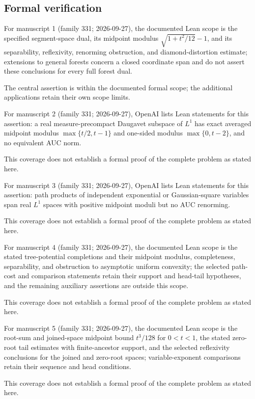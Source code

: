 \documentclass[11pt]{article}
\begin{document}
\subsection{Formal verification}
For manuscript 1 (family 331; 2026-09-27), the documented Lean scope is the specified segment-space dual, its midpoint modulus $\sqrt{1+t^2/12}-1$, and its separability, reflexivity, renorming obstruction, and diamond-distortion estimate; extensions to general forests concern a closed coordinate span and do not assert these conclusions for every full forest dual.

The central assertion is within the documented formal scope; the additional applications retain their own scope limits.

For manuscript 2 (family 331; 2026-09-27), OpenAI lists Lean statements for this assertion: a real measure-precompact Daugavet subspace of $L^1$ has exact averaged midpoint modulus $\max\{t/2,t-1\}$ and one-sided modulus $\max\{0,t-2\}$, and no equivalent AUC norm.

This coverage does not establish a formal proof of the complete problem as stated here.

For manuscript 3 (family 331; 2026-09-27), OpenAI lists Lean statements for this assertion: path products of independent exponential or Gaussian-square variables span real $L^1$ spaces with positive midpoint moduli but no AUC renorming.

This coverage does not establish a formal proof of the complete problem as stated here.

For manuscript 4 (family 331; 2026-09-27), the documented Lean scope is the stated tree-potential completions and their midpoint modulus, completeness, separability, and obstruction to asymptotic uniform convexity; the selected path-cost and comparison statements retain their support and head-tail hypotheses, and the remaining auxiliary assertions are outside this scope.

This coverage does not establish a formal proof of the complete problem as stated here.

For manuscript 5 (family 331; 2026-09-27), the documented Lean scope is the root-sum and joined-space midpoint bound $t^3/128$ for $0<t<1$, the stated zero-root tail estimates with finite-ancestor support, and the selected reflexivity conclusions for the joined and zero-root spaces; variable-exponent comparisons retain their sequence and head conditions.

This coverage does not establish a formal proof of the complete problem as stated here.
\end{document}
